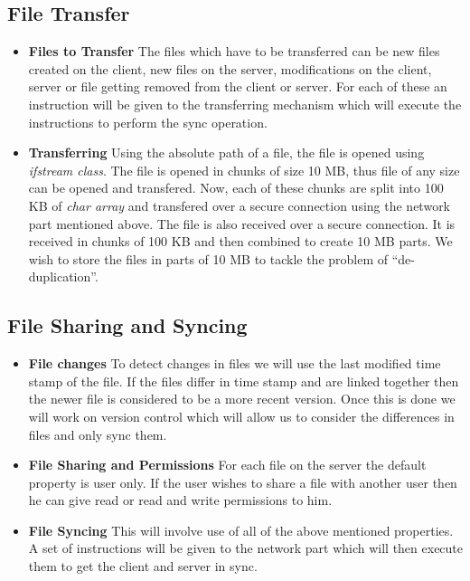 \documentclass{article}
\begin{document}
			\subsection{File Transfer}
				\begin{itemize}
					\item \textbf{Files to Transfer}
						\newline
						The files which have to be transferred can be new files created on the client, new files on the server, modifications on the client, server or file getting removed from the client or server. For each of these an instruction will be given to the transferring mechanism which will execute the instructions to perform the sync operation.
					\item \textbf{Transferring}
						\newline
						Using the absolute path of a file, the file is opened using \textit{ifstream class}. The file is opened in chunks of size 10 MB, thus file of any size can be opened and transfered.
						Now, each of these chunks are split into 100 KB of \textit{char array} and transfered over a secure connection using the network part mentioned above.
						\newline
						The file is also received over a secure connection. It is received in chunks of 100 KB and then combined to create 10 MB parts. We wish to store the files in parts of 10 MB to tackle the problem of ``de-duplication''.
				\end{itemize}	
			\subsection{File Sharing and Syncing}
				\begin{itemize}
					\item \textbf{File changes}
						\newline
						To detect changes in files we will use the last modified time stamp of the file. If the files differ in time stamp and are linked together then the newer file is considered to be a more recent version. 
						\newline 
						Once this is done we will work on version control which will allow us to consider the differences in files and only sync them.
					\item \textbf{File Sharing and Permissions}
						\newline
						For each file on the server the default property is user only. If the user wishes to share a file with another user then he can give read or read and write permissions to him. 
					\item \textbf{File Syncing}
						This will involve use of all of the above mentioned properties. A set of instructions will be given to the network part which will then execute them to get the client and server in sync.
					\end{itemize}
\end{document}
